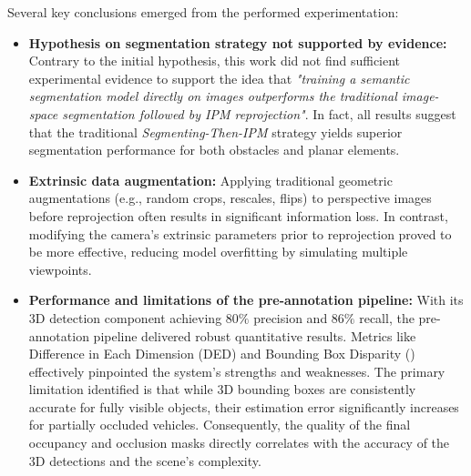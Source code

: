 Several key conclusions emerged from the performed experimentation:
\begin{itemize}

    \item \textbf{Hypothesis on segmentation strategy not supported by evidence:} Contrary to the initial hypothesis, this work did not find sufficient experimental evidence to support the idea that \textit{"training a semantic segmentation model directly on  images outperforms the traditional image-space segmentation followed by IPM reprojection"}. In fact, all results suggest that the traditional \textit{Segmenting-Then-IPM} strategy yields superior segmentation performance for both obstacles and planar elements.

    \item \textbf{Extrinsic  data augmentation:} Applying traditional geometric augmentations (e.g., random crops, rescales, flips) to perspective images before  reprojection often results in significant information loss. In contrast, modifying the camera's extrinsic parameters prior to  reprojection proved to be more effective, reducing model overfitting by simulating multiple viewpoints.

    \item \textbf{Performance and limitations of the pre-annotation pipeline:} With its 3D detection component achieving $80\%$ precision and $86\%$ recall, the pre-annotation pipeline delivered robust quantitative results. Metrics like Difference in Each Dimension (DED) and Bounding Box Disparity () effectively pinpointed the system's strengths and weaknesses. The primary limitation identified is that while 3D bounding boxes are consistently accurate for fully visible objects, their estimation error significantly increases for partially occluded vehicles. Consequently, the quality of the final occupancy and occlusion masks directly correlates with the accuracy of the 3D detections and the scene's complexity.

\end{itemize}

